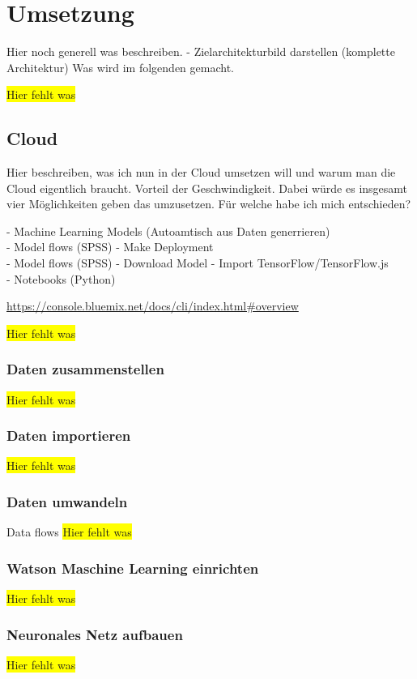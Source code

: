 \section{Umsetzung}
Hier noch generell was beschreiben. - Zielarchitekturbild darstellen (komplette Architektur)
Was wird im folgenden gemacht.

\colorbox{yellow}{Hier fehlt was}

\subsection{Cloud}
Hier beschreiben, was ich nun in der Cloud umsetzen will und warum man die Cloud eigentlich braucht. Vorteil der
Geschwindigkeit. Dabei würde es insgesamt vier Möglichkeiten geben das umzusetzen. Für welche habe ich mich
entschieden?

- Machine Learning Models (Autoamtisch aus Daten generrieren)\\
- Model flows (SPSS) - Make Deployment\\
- Model flows (SPSS) - Download Model - Import TensorFlow/TensorFlow.js\\
- Notebooks (Python)

\url{https://console.bluemix.net/docs/cli/index.html#overview}

\colorbox{yellow}{Hier fehlt was}

\subsubsection{Daten zusammenstellen}
\colorbox{yellow}{Hier fehlt was}

\subsubsection{Daten importieren}
\colorbox{yellow}{Hier fehlt was}

\subsubsection{Daten umwandeln}
Data flows
\colorbox{yellow}{Hier fehlt was}

\subsubsection{Watson Maschine Learning einrichten}
\colorbox{yellow}{Hier fehlt was}

\subsubsection{Neuronales Netz aufbauen}
\colorbox{yellow}{Hier fehlt was}

